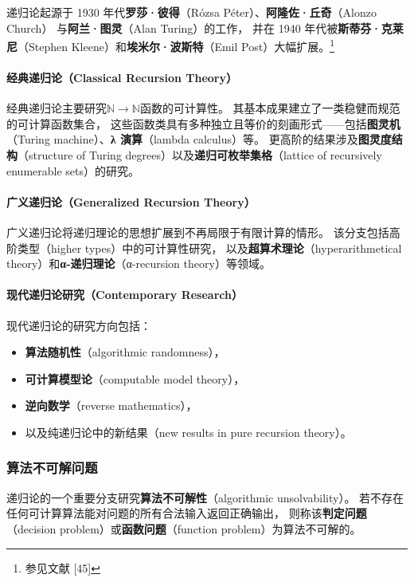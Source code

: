 递归论起源于 1930 年代\textbf{罗莎·彼得}（Rózsa Péter）、\textbf{阿隆佐·丘奇}（Alonzo Church）  
与\textbf{阿兰·图灵}（Alan Turing）的工作，  
并在 1940 年代被\textbf{斯蒂芬·克莱尼}（Stephen Kleene）和\textbf{埃米尔·波斯特}（Emil Post）大幅扩展。\footnote{参见文献 [45]}  

\paragraph{经典递归论（Classical Recursion Theory）}
经典递归论主要研究\(\mathbb{N} \to \mathbb{N}\)函数的可计算性。  
其基本成果建立了一类稳健而规范的可计算函数集合，
这些函数类具有多种独立且等价的刻画形式——包括\textbf{图灵机}（Turing machine）、\textbf{λ 演算}（lambda calculus）等。  
更高阶的结果涉及\textbf{图灵度结构}（structure of Turing degrees）以及\textbf{递归可枚举集格}（lattice of recursively enumerable sets）的研究。

\paragraph{广义递归论（Generalized Recursion Theory）}
广义递归论将递归理论的思想扩展到不再局限于有限计算的情形。  
该分支包括高阶类型（higher types）中的可计算性研究，
以及\textbf{超算术理论}（hyperarithmetical theory）和\textbf{α-递归理论}（α-recursion theory）等领域。

\paragraph{现代递归论研究（Contemporary Research）}
现代递归论的研究方向包括：
\begin{itemize}
  \item \textbf{算法随机性}（algorithmic randomness），
  \item \textbf{可计算模型论}（computable model theory），
  \item \textbf{逆向数学}（reverse mathematics），
  \item 以及纯递归论中的新结果（new results in pure recursion theory）。
\end{itemize}
\subsubsection{算法不可解问题}
递归论的一个重要分支研究\textbf{算法不可解性}（algorithmic unsolvability）。  
若不存在任何可计算算法能对问题的所有合法输入返回正确输出，
则称该\textbf{判定问题}（decision problem）或\textbf{函数问题}（function problem）为算法不可解的。

